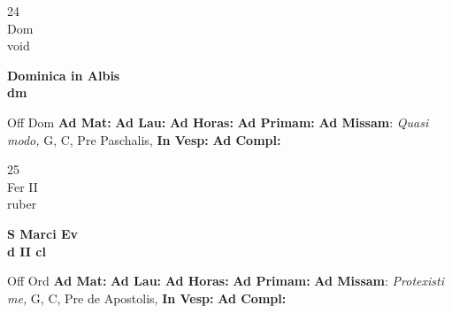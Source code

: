 \documentclass[10pt, openany]{book}
\begin{document}
    \begin{center}
        \begin{minipage}{3.5in}
            \vspace{2em}
            \begin{minipage}{0.5in}
                {\Huge 24} \\
                {\normalsize Dom} \\
                {\normalsize void}
            \end{minipage}
            \begin{minipage}{3.0in}
                \textbf{ \large Dominica in Albis \\
                \textnormal{\normalsize dm}} \\ 
            \end{minipage}
            \begin{justify}Off Dom
                \textbf{Ad Mat: }
                \textbf{Ad Lau: }
                \textbf{Ad Horas: }
                \textbf{Ad Primam: }\textbf{Ad Missam}: \textit{Quasi modo,} G, C, Pre Paschalis,  
                \textbf{In Vesp: }
                \textbf{Ad Compl: }
            \end{justify}
        \end{minipage}
    \end{center}

    \begin{center}
        \begin{minipage}{3.5in}
            \vspace{2em}
            \begin{minipage}{0.5in}
                {\Huge 25} \\
                {\normalsize Fer II} \\
                {\normalsize ruber}
            \end{minipage}
            \begin{minipage}{3.0in}
                \textbf{ \large S Marci Ev \\
                \textnormal{\normalsize d II cl}} \\ 
            \end{minipage}
            \begin{justify}Off Ord
                \textbf{Ad Mat: }
                \textbf{Ad Lau: }
                \textbf{Ad Horas: }
                \textbf{Ad Primam: }\textbf{Ad Missam}: \textit{Protexisti me,} G, C, Pre de Apostolis,  
                \textbf{In Vesp: }
                \textbf{Ad Compl: }
            \end{justify}
        \end{minipage}
    \end{center}
\end{document}
